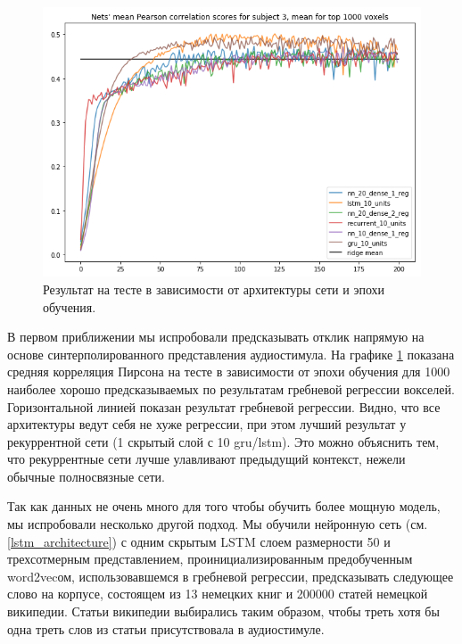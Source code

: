 \documentclass[pdftex,ptm,12pt,a4paper]{report}
\theoremstyle{definition}
\begin{document}
\begin{figure}[h]
\centering
\includegraphics[scale=0.5]{graphics/sub3_net.png}
\caption{Результат на тесте в зависимости от архитектуры сети и эпохи обучения.}
\label{nets_scores}
\end{figure}

В первом приближении мы испробовали предсказывать отклик напрямую на основе синтерполированного представления аудиостимула. На графике \ref{nets_scores} показана средняя корреляция Пирсона на тесте в зависимости от эпохи обучения для 1000 наиболее хорошо предсказываемых по результатам гребневой регрессии вокселей. Горизонтальной линией показан результат гребневой регрессии. Видно, что все архитектуры ведут себя не хуже регрессии, при этом лучший результат у рекуррентной сети (1 скрытый слой с 10 gru/lstm). Это можно объяснить тем, что рекуррентные сети лучше улавливают предыдущий контекст, нежели обычные полносвязные сети.

Так как данных не очень много для того чтобы обучить более мощную модель, мы испробовали несколько другой подход. 
Мы обучили нейронную сеть (см. \ref{lstm_architecture}) с одним скрытым LSTM слоем размерности 50 и трехсотмерным представлением, проинициализированным предобученным word2vecом, использовавшемся в гребневой регрессии, предсказывать следующее слово на корпусе, состоящем из 13 немецких книг и 200000 статей немецкой википедии. Статьи википедии выбирались таким образом, чтобы треть хотя бы одна треть слов из статьи присутствовала в аудиостимуле.
\end{document}
